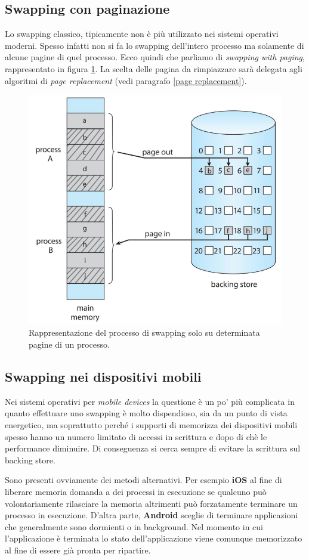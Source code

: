 % 
\subsection{Swapping con paginazione}
Lo swapping classico, tipicamente non è più utilizzato nei sistemi operativi moderni. Spesso infatti non si fa lo swapping dell'intero processo ma solamente di alcune pagine di quel processo. Ecco quindi che parliamo di \textit{swapping with paging}, rappresentato in figura \ref{fig:swapping_with_paging}. La scelta delle pagina da rimpiazzare sarà delegata agli algoritmi di \textit{page replacement} (vedi paragrafo \ref{page replacement}).
\begin{figure}[h]
    \centering
    \includegraphics[width = .5\textwidth]{../res/imgs/main memory/swapping_with_paging.png}
    \caption{Rappresentazione del processo di swapping solo su determinata pagine di un processo.}
    \label{fig:swapping_with_paging}
\end{figure}

% 
\subsection{Swapping nei dispositivi mobili}
Nei sistemi operativi per \textit{mobile devices} la questione è un po' più complicata in quanto effettuare uno swapping è molto dispendioso, sia da un punto di vista energetico, ma soprattutto perché i supporti di memorizza dei dispositivi mobili spesso hanno un numero limitato di accessi in scrittura e dopo di chè le performance diminuire. Di conseguenza si cerca sempre di evitare la scrittura sul backing store.

Sono presenti ovviamente dei metodi alternativi. Per esempio \textbf{iOS} al fine di liberare memoria domanda a dei processi in esecuzione se qualcuno può volontariamente rilasciare la memoria altrimenti può forzatamente terminare un processo in esecuzione. D'altra parte, \textbf{Android} sceglie di terminare applicazioni che generalmente sono dormienti o in background. Nel momento in cui l'applicazione è terminata lo stato dell'applicazione viene comunque memorizzato al fine di essere già pronta per ripartire.  

